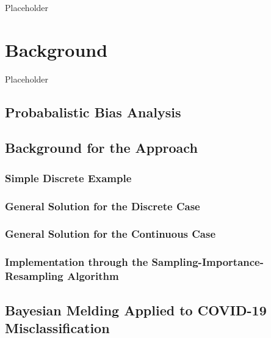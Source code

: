 \documentclass[12pt,twoside]{smiththesis}
\begin{document}
Placeholder

\hypertarget{background}{%
\chapter{Background}\label{background}}

Placeholder

\hypertarget{probabalistic-bias-analysis}{%
\section{Probabalistic Bias Analysis}\label{probabalistic-bias-analysis}}

\hypertarget{background-for-the-approach}{%
\section{Background for the Approach}\label{background-for-the-approach}}

\hypertarget{simple-discrete-example}{%
\subsection{Simple Discrete Example}\label{simple-discrete-example}}

\hypertarget{general-solution-for-the-discrete-case}{%
\subsection{General Solution for the Discrete Case}\label{general-solution-for-the-discrete-case}}

\hypertarget{general-solution-for-the-continuous-case}{%
\subsection{General Solution for the Continuous Case}\label{general-solution-for-the-continuous-case}}

\hypertarget{implementation-through-the-sampling-importance-resampling-algorithm}{%
\subsection{Implementation through the Sampling-Importance-Resampling Algorithm}\label{implementation-through-the-sampling-importance-resampling-algorithm}}

\hypertarget{meld}{%
\section{Bayesian Melding Applied to COVID-19 Misclassification}\label{meld}}
\end{document}
